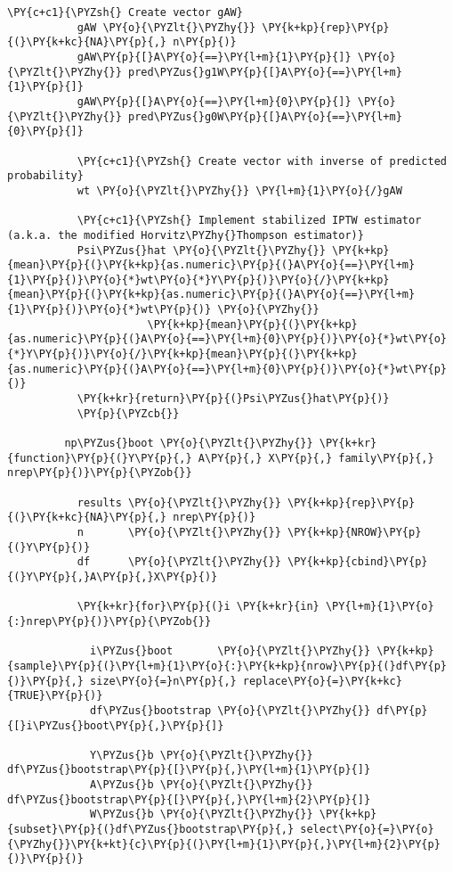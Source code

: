 \begin{Verbatim}[commandchars=\\\{\}]
           \PY{c+c1}{\PYZsh{} Create vector gAW}
           gAW \PY{o}{\PYZlt{}\PYZhy{}} \PY{k+kp}{rep}\PY{p}{(}\PY{k+kc}{NA}\PY{p}{,} n\PY{p}{)}
           gAW\PY{p}{[}A\PY{o}{==}\PY{l+m}{1}\PY{p}{]} \PY{o}{\PYZlt{}\PYZhy{}} pred\PYZus{}g1W\PY{p}{[}A\PY{o}{==}\PY{l+m}{1}\PY{p}{]}
           gAW\PY{p}{[}A\PY{o}{==}\PY{l+m}{0}\PY{p}{]} \PY{o}{\PYZlt{}\PYZhy{}} pred\PYZus{}g0W\PY{p}{[}A\PY{o}{==}\PY{l+m}{0}\PY{p}{]}
             
           \PY{c+c1}{\PYZsh{} Create vector with inverse of predicted probability}
           wt \PY{o}{\PYZlt{}\PYZhy{}} \PY{l+m}{1}\PY{o}{/}gAW
             
           \PY{c+c1}{\PYZsh{} Implement stabilized IPTW estimator (a.k.a. the modified Horvitz\PYZhy{}Thompson estimator)}
           Psi\PYZus{}hat \PY{o}{\PYZlt{}\PYZhy{}} \PY{k+kp}{mean}\PY{p}{(}\PY{k+kp}{as.numeric}\PY{p}{(}A\PY{o}{==}\PY{l+m}{1}\PY{p}{)}\PY{o}{*}wt\PY{o}{*}Y\PY{p}{)}\PY{o}{/}\PY{k+kp}{mean}\PY{p}{(}\PY{k+kp}{as.numeric}\PY{p}{(}A\PY{o}{==}\PY{l+m}{1}\PY{p}{)}\PY{o}{*}wt\PY{p}{)} \PY{o}{\PYZhy{}}
                      \PY{k+kp}{mean}\PY{p}{(}\PY{k+kp}{as.numeric}\PY{p}{(}A\PY{o}{==}\PY{l+m}{0}\PY{p}{)}\PY{o}{*}wt\PY{o}{*}Y\PY{p}{)}\PY{o}{/}\PY{k+kp}{mean}\PY{p}{(}\PY{k+kp}{as.numeric}\PY{p}{(}A\PY{o}{==}\PY{l+m}{0}\PY{p}{)}\PY{o}{*}wt\PY{p}{)}
           \PY{k+kr}{return}\PY{p}{(}Psi\PYZus{}hat\PY{p}{)}
           \PY{p}{\PYZcb{}}
         
         np\PYZus{}boot \PY{o}{\PYZlt{}\PYZhy{}} \PY{k+kr}{function}\PY{p}{(}Y\PY{p}{,} A\PY{p}{,} X\PY{p}{,} family\PY{p}{,} nrep\PY{p}{)}\PY{p}{\PYZob{}}
             
           results \PY{o}{\PYZlt{}\PYZhy{}} \PY{k+kp}{rep}\PY{p}{(}\PY{k+kc}{NA}\PY{p}{,} nrep\PY{p}{)}
           n       \PY{o}{\PYZlt{}\PYZhy{}} \PY{k+kp}{NROW}\PY{p}{(}Y\PY{p}{)}
           df      \PY{o}{\PYZlt{}\PYZhy{}} \PY{k+kp}{cbind}\PY{p}{(}Y\PY{p}{,}A\PY{p}{,}X\PY{p}{)}
             
           \PY{k+kr}{for}\PY{p}{(}i \PY{k+kr}{in} \PY{l+m}{1}\PY{o}{:}nrep\PY{p}{)}\PY{p}{\PYZob{}}
               
             i\PYZus{}boot       \PY{o}{\PYZlt{}\PYZhy{}} \PY{k+kp}{sample}\PY{p}{(}\PY{l+m}{1}\PY{o}{:}\PY{k+kp}{nrow}\PY{p}{(}df\PY{p}{)}\PY{p}{,} size\PY{o}{=}n\PY{p}{,} replace\PY{o}{=}\PY{k+kc}{TRUE}\PY{p}{)}
             df\PYZus{}bootstrap \PY{o}{\PYZlt{}\PYZhy{}} df\PY{p}{[}i\PYZus{}boot\PY{p}{,}\PY{p}{]}
               
             Y\PYZus{}b \PY{o}{\PYZlt{}\PYZhy{}} df\PYZus{}bootstrap\PY{p}{[}\PY{p}{,}\PY{l+m}{1}\PY{p}{]}
             A\PYZus{}b \PY{o}{\PYZlt{}\PYZhy{}} df\PYZus{}bootstrap\PY{p}{[}\PY{p}{,}\PY{l+m}{2}\PY{p}{]}
             W\PYZus{}b \PY{o}{\PYZlt{}\PYZhy{}} \PY{k+kp}{subset}\PY{p}{(}df\PYZus{}bootstrap\PY{p}{,} select\PY{o}{=}\PY{o}{\PYZhy{}}\PY{k+kt}{c}\PY{p}{(}\PY{l+m}{1}\PY{p}{,}\PY{l+m}{2}\PY{p}{)}\PY{p}{)}
         

\end{Verbatim}
